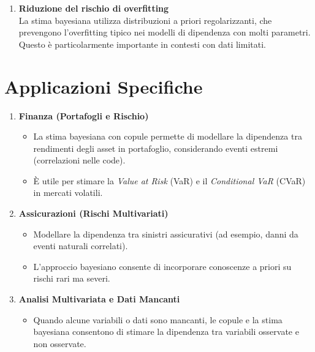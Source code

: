 \documentclass[a4paper,12pt]{article}
\begin{document}
\begin{itemize}
\begin{enumerate}
		\item \textbf{Riduzione del rischio di overfitting} \\
		La stima bayesiana utilizza distribuzioni a priori regolarizzanti, che prevengono l'overfitting tipico nei modelli di dipendenza con molti parametri. Questo è particolarmente importante in contesti con dati limitati.
	\end{enumerate}
	\section*{Applicazioni Specifiche}
	
	\begin{enumerate}
		\item \textbf{Finanza (Portafogli e Rischio)} \\
		\begin{itemize}
			\item La stima bayesiana con copule permette di modellare la dipendenza tra rendimenti degli asset in portafoglio, considerando eventi estremi (correlazioni nelle code).
			\item È utile per stimare la \textit{Value at Risk} (VaR) e il \textit{Conditional VaR} (CVaR) in mercati volatili.
		\end{itemize}
		
		\item \textbf{Assicurazioni (Rischi Multivariati)} \\
		\begin{itemize}
			\item Modellare la dipendenza tra sinistri assicurativi (ad esempio, danni da eventi naturali correlati).
			\item L'approccio bayesiano consente di incorporare conoscenze a priori su rischi rari ma severi.
		\end{itemize}
		
		\item \textbf{Analisi Multivariata e Dati Mancanti} \\
		\begin{itemize}
			\item Quando alcune variabili o dati sono mancanti, le copule e la stima bayesiana consentono di stimare la dipendenza tra variabili osservate e non osservate.
		\end{itemize}
	\end{enumerate}
\end{itemize}
\end{document}
